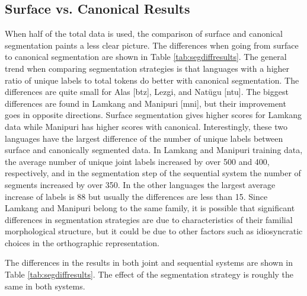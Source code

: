 \subsection{Surface vs. Canonical Results}

When half of the total data is used, the comparison of surface and canonical segmentation paints a less clear picture. The differences when going from surface to canonical segmentation are shown in Table \ref{tab:segdiffresults}. The general trend when comparing segmentation strategies is that languages with a higher ratio of unique labels to total tokens do better with canonical segmentation. The differences are quite small for Alas [btz], Lezgi, and Nat\"ugu [ntu]. The biggest differences are found in Lamkang and Manipuri [mni], but their improvement goes in opposite directions. Surface segmentation gives higher scores for Lamkang data while Manipuri has higher scores with canonical. Interestingly, these two languages have the largest difference of the number of unique labels between surface and canonically segmented data. In Lamkang and Manipuri training data, the average number of unique joint labels increased by over 500 and 400, respectively, and in the segmentation step of the sequential system the number of segments increased by over 350. In the other languages the largest average increase of labels is 88 but usually the differences are less than 15. Since Lamkang and Manipuri belong to the same family, it is possible that significant differences in segmentation strategies are due to characteristics of their familial morphological structure, but it could be due to other factors such as idiosyncratic choices in the orthographic representation. 

The differences in the results in both joint and sequential systems are shown in Table \ref{tab:segdiffresults}. The effect of the segmentation strategy is roughly the same in both systems. 

